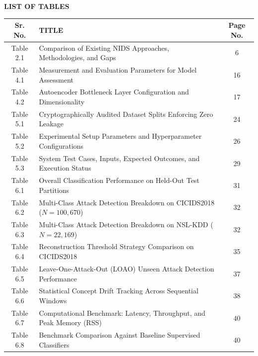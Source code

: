 \documentclass[12pt,a4paper]{report}
\begin{document}
\begin{center}
{\Large\bfseries LIST OF TABLES}\\[0.4cm]
\end{center}

\noindent
\begin{tabularx}{\textwidth}{|c|X|c|}
\hline
\textbf{Sr. No.} & \textbf{\centering TITLE} & \textbf{Page No.} \\
\hline
Table 2.1 & Comparison of Existing NIDS Approaches, Methodologies, and Gaps & 6 \\
\hline
Table 4.1 & Measurement and Evaluation Parameters for Model Assessment & 16 \\
\hline
Table 4.2 & Autoencoder Bottleneck Layer Configuration and Dimensionality & 17 \\
\hline
Table 5.1 & Cryptographically Audited Dataset Splits Enforcing Zero Leakage & 24 \\
\hline
Table 5.2 & Experimental Setup Parameters and Hyperparameter Configurations & 26 \\
\hline
Table 5.3 & System Test Cases, Inputs, Expected Outcomes, and Execution Status & 29 \\
\hline
Table 6.1 & Overall Classification Performance on Held-Out Test Partitions & 31 \\
\hline
Table 6.2 & Multi-Class Attack Detection Breakdown on CICIDS2018 ($N = 100{,}670$) & 32 \\
\hline
Table 6.3 & Multi-Class Attack Detection Breakdown on NSL-KDD ($N = 22{,}169$) & 32 \\
\hline
Table 6.4 & Reconstruction Threshold Strategy Comparison on CICIDS2018 & 35 \\
\hline
Table 6.5 & Leave-One-Attack-Out (LOAO) Unseen Attack Detection Performance & 37 \\
\hline
Table 6.6 & Statistical Concept Drift Tracking Across Sequential Windows & 38 \\
\hline
Table 6.7 & Computational Benchmark: Latency, Throughput, and Peak Memory (RSS) & 40 \\
\hline
Table 6.8 & Benchmark Comparison Against Baseline Supervised Classifiers & 40 \\
\hline
\end{tabularx}

\clearpage
{}
\setcounter{page}{9}
\thispagestyle{plain}
\end{document}
